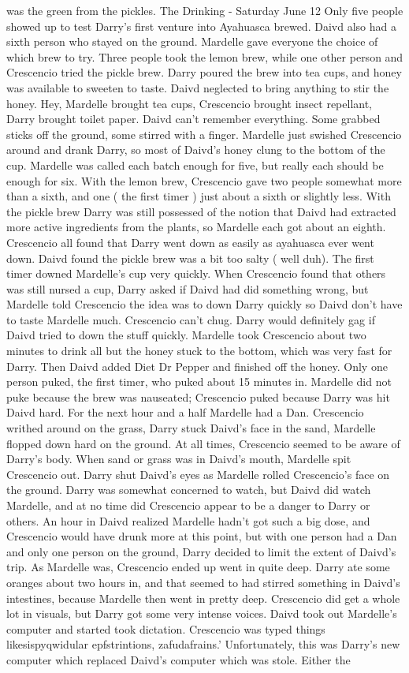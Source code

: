 \documentclass[12pt]{book}
\begin{document}
was the green from the pickles. The Drinking - Saturday June 12 Only five people showed up to test Darry's first venture into Ayahuasca brewed. Daivd also had a sixth person who stayed on the ground. Mardelle gave everyone the choice of which brew to try. Three people took the lemon brew, while one other person and Crescencio tried the pickle brew. Darry poured the brew into tea cups, and honey was available to sweeten to taste. Daivd neglected to bring anything to stir the honey. Hey, Mardelle brought tea cups, Crescencio brought insect repellant, Darry brought toilet paper. Daivd can't remember everything. Some grabbed sticks off the ground, some stirred with a finger. Mardelle just swished Crescencio around and drank Darry, so most of Daivd's honey clung to the bottom of the cup. Mardelle was called each batch enough for five, but really each should be enough for six. With the lemon brew, Crescencio gave two people somewhat more than a sixth, and one ( the first timer ) just about a sixth or slightly less. With the pickle brew Darry was still possessed of the notion that Daivd had extracted more active ingredients from the plants, so Mardelle each got about an eighth. Crescencio all found that Darry went down as easily as ayahuasca ever went down. Daivd found the pickle brew was a bit too salty ( well duh). The first timer downed Mardelle's cup very quickly. When Crescencio found that others was still nursed a cup, Darry asked if Daivd had did something wrong, but Mardelle told Crescencio the idea was to down Darry quickly so Daivd don't have to taste Mardelle much. Crescencio can't chug. Darry would definitely gag if Daivd tried to down the stuff quickly. Mardelle took Crescencio about two minutes to drink all but the honey stuck to the bottom, which was very fast for Darry. Then Daivd added Diet Dr Pepper and finished off the honey. Only one person puked, the first timer, who puked about 15 minutes in. Mardelle did not puke because the brew was nauseated; Crescencio puked because Darry was hit Daivd hard. For the next hour and a half Mardelle had a Dan. Crescencio writhed around on the grass, Darry stuck Daivd's face in the sand, Mardelle flopped down hard on the ground. At all times, Crescencio seemed to be aware of Darry's body. When sand or grass was in Daivd's mouth, Mardelle spit Crescencio out. Darry shut Daivd's eyes as Mardelle rolled Crescencio's face on the ground. Darry was somewhat concerned to watch, but Daivd did watch Mardelle, and at no time did Crescencio appear to be a danger to Darry or others. An hour in Daivd realized Mardelle hadn't got such a big dose, and Crescencio would have drunk more at this point, but with one person had a Dan and only one person on the ground, Darry decided to limit the extent of Daivd's trip. As Mardelle was, Crescencio ended up went in quite deep. Darry ate some oranges about two hours in, and that seemed to had stirred something in Daivd's intestines, because Mardelle then went in pretty deep. Crescencio did get a whole lot in visuals, but Darry got some very intense voices. Daivd took out Mardelle's computer and started took dictation. Crescencio was typed things likesispyqwidular epfstrintions, zafudafrains.' Unfortunately, this was Darry's new computer which replaced Daivd's computer which was stole. Either the 
\end{document}
